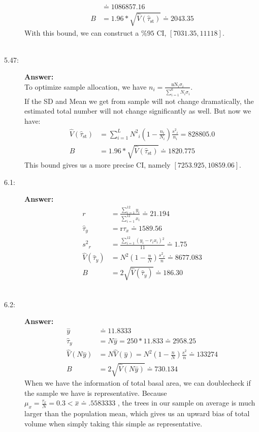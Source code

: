 \documentclass{article}
\begin{document}
\begin{description}
\begin{align}
          &\doteq 1086857.16\\
          B&=1.96*\sqrt{\hat{V}\left(\hat{\tau }_{\text{st}}\right)}\doteq 2043.35
        \end{align}
        With this bound, we can construct a $\%95$ CI, $[7031.35, 11118]$.\\\\
    \item[5.47:]{\bf Answer:}\\
        To optimize sample allocation, we have $n_i=\frac{\text{nN}_i\sigma _i}{\sum _{i=1}^6 N_i\sigma _i}$.\\
        If the SD and Mean we get from sample will not change dramatically, the estimated total number will not change significantly as well. But now we have:
        \begin{align}
          \hat{V}\left(\hat{\tau }_{\text{st}}\right)&=\sum _{i=1}^L N^2{}_i\left(1-\frac{n_i}{N_i}\right)\frac{s^2{}_i}{n_i}=828805.0\\
          B&=1.96*\sqrt{\hat{V}\left(\hat{\tau }_{\text{st}}\right)}\doteq 1820.775
        \end{align}
        This bound gives us a more precise CI, namely $[7253.925, 10859.06]$.\newpage
    \item[6.1:]{\bf Answer:}\\
        \begin{align}
          r&=\frac{\sum _{i=1}^{12} y_i}{\sum _{i=1}^{12} x_i}\doteq 21.194\\
          \hat{\tau }_y&=\text{r$\tau $}_x\doteq 1589.56\\
          s^2{}_r&=\frac{\sum _{i=1}^{12} \left(y_i-r_ix_i\right){}^2}{11}\doteq 1.75\\
          \hat{V}\left(\hat{\tau }_y\right)&=N^2\left(1-\frac{n}{N}\right)\frac{s^2{}_r}{n}\doteq 8677.083\\
          B&=2\sqrt{\hat{V}\left(\hat{\tau }_y\right)}\doteq 186.30
        \end{align}\\
    \item[6.2:]{\bf Answer:}\\
        \begin{align}
          \overset{-}{y}&\doteq 11.8333\\
          \hat{\tau }_y&=N\overset{-}{y}=250*11.833\doteq 2958.25\\
          \hat{V}\left(N\overset{-}{y}\right)&=N\hat{V}\left(\overset{-}{y}\right)=N^2\left(1-\frac{n}{N}\right)\frac{s^2}{n}\doteq 133274\\
          B&=2\sqrt{\hat{V}\left(N\overset{-}{y}\right)}\doteq 730.134
        \end{align}
        When we have the information of total basal area, we can doublecheck if the sample we have is representative. Because $\mu _x=\frac{\tau _x}{N}=0.3<\overset{-}{x}\doteq .5583333$ , the trees in our sample on average is much larger than the population mean, which gives us an upward bias of total volume when simply taking this simple as representative.
\end{description}
\end{document}
